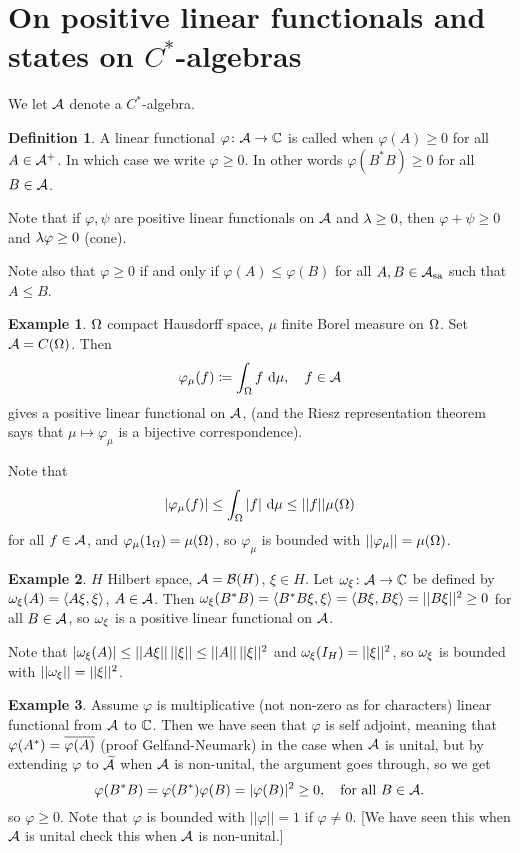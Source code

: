 \documentclass[10pt,english,a4paper]{article}
\theoremstyle{definition}
\newtheorem*{definition}{Definition}
\newtheorem*{example}{Example}
\let\emph\relax %
\def\tAs{\widetilde{\As}}
\def\Assa{\As_{\text{sa}}}
\begin{document}
\section{On positive linear functionals and states on $C^*$-algebras}
We let $\mathcal{A}$ denote a $C^*$-algebra.
\begin{definition}
    A linear functional $\varphi\colon \mathcal{A} \to \mathbb{C}$ is called \emph{positive}
when $\varphi(A)\geq 0$ for all $A \in \mathcal{A}^+$. In which case we write 
$\varphi \geq 0$. In other words $\varphi(B^*B) \geq 0$ for all $B \in \mathcal{A}$.
\end{definition}
Note that if $\varphi,\psi$ are positive linear functionals on  $\mathcal{A}$ and 
$\lambda \geq 0$, then $\varphi + \psi \geq 0$ and $\lambda\varphi \geq 0$ (cone).

Note also that $\varphi \geq 0$ if and only if $\varphi(A)\leq \varphi(B)$
for all $A,B \in \Assa$ such that $A \leq B$. 
\begin{example}
    $\Omega$ compact Hausdorff space, $\mu$ finite Borel measure on $\Omega$.
Set $\mathcal{A} = C(\Omega)$. Then 
\[ \varphi_{\mu}(f) \coloneqq \int_{\Omega} f ~\text{d} \mu , \quad f \in \mathcal{A}\]
gives a positive linear functional on $\mathcal{A}$, (and the
Riesz representation theorem says that $\mu \mapsto \varphi_{\mu}$ is a 
bijective correspondence).

Note that 
\[ |\varphi_{\mu}(f)| \leq \int_{\Omega}|f|~\text{d} \mu \leq ||f|| \mu(\Omega) \]
for all $f \in \mathcal{A}$, and $\varphi_{\mu} (1_{\Omega}) = \mu(\Omega)$,
so $\varphi_{\mu}$ is bounded with $||\varphi_{\mu}|| = \mu(\Omega)$.
\end{example}
\begin{example}
    $H$ Hilbert space, $\mathcal{A} = \mathcal{B}(H)$, $\xi \in H$.
Let $\omega_{\xi}\colon \mathcal{A} \to \mathbb{C}$ be defined by 
$\omega_{\xi}(A) = \left\langle A\xi,\xi \right\rangle$, $A \in \mathcal{A}$. Then 
$\omega_{\xi}(B^*B)= \left\langle B^*B\xi,\xi \right\rangle = \left\langle B\xi,B\xi \right\rangle = ||B\xi||^2 \geq 0$
for all $B \in \mathcal{A}$, so $\omega_{\xi}$ is a positive linear functional on $\mathcal{A}$.

Note that $|\omega_{\xi}(A)| \leq ||A\xi||\,||\xi|| \leq ||A||\,||\xi||^2$ 
and $\omega_{\xi}(I_{H}) = ||\xi||^2$, so $\omega_{\xi}$ is bounded with $||\omega_{\xi}|| = ||\xi||^2$.

\end{example}

\begin{example}
    Assume $\varphi$ is multiplicative (not non-zero as for characters) linear 
functional from $\mathcal{A}$ to $\mathbb{C}$. Then we have seen that $\varphi$ is self 
adjoint, meaning that $\varphi(A^*) = \overline{\varphi(A)}$ (proof Gelfand-Neumark)
in the case when $\mathcal{A}$ is unital, but by extending $\varphi$ to $\tAs$ when $\mathcal{A}$
is non-unital, the argument goes through, so we get 
\[\varphi(B^*B) = \varphi(B^*)\varphi(B) = |\varphi(B)|^2 \geq 0, \quad
\text{for all }B\in \mathcal{A}.\]
so $\varphi \geq 0$. Note that $\varphi$ is bounded with $||\varphi|| = 1$
if $\varphi \neq 0$.
[We have seen this when $\mathcal{A}$ is unital check this when $\mathcal{A}$ is non-unital.]
\end{example}
\end{document}
